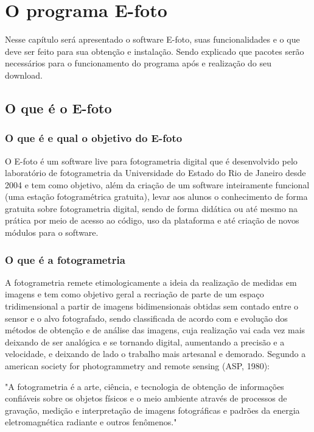 \chapter{O programa E-foto}

Nesse capítulo será apresentado o software E-foto, suas funcionalidades e o que deve ser feito para sua obtenção e instalação. Sendo explicado que pacotes serão necessários para o funcionamento do programa após e realização do seu download.

\section{O que é o E-foto}
\subsection{O que é e qual o objetivo do E-foto}
O E-foto é um software live para fotogrametria digital que é desenvolvido pelo laboratório de fotogrametria da Universidade do Estado do Rio de Janeiro desde 2004 e tem como objetivo, além da criação de um software inteiramente funcional (uma estação fotogramétrica gratuita), levar aos alunos o conhecimento de forma gratuita sobre fotogrametria digital, sendo de forma didática ou até mesmo na prática por meio de acesso ao código, uso da plataforma e até criação de novos módulos para o software.

\subsection{O que é a fotogrametria}
A fotogrametria remete etimologicamente a ideia da realização de medidas em imagens e tem como objetivo geral a recriação de parte de um espaço tridimensional a partir de imagens bidimensionais obtidas sem contado entre o sensor e o alvo fotografado, sendo classificada de acordo com e evolução dos métodos de obtenção e de análise das imagens, cuja realização vai cada vez mais deixando de ser analógica e se tornando digital, aumentando a precisão e a velocidade, e deixando de lado o trabalho mais artesanal e demorado.
Segundo a american society for photogrammetry and remote sensing (ASP, 1980):

"A fotogrametria é a arte, ciência, e tecnologia de obtenção de informações confiáveis sobre os objetos físicos e o meio ambiente através de processos de gravação, medição e interpretação de imagens fotográficas e padrões da energia eletromagnética radiante e outros fenômenos."

